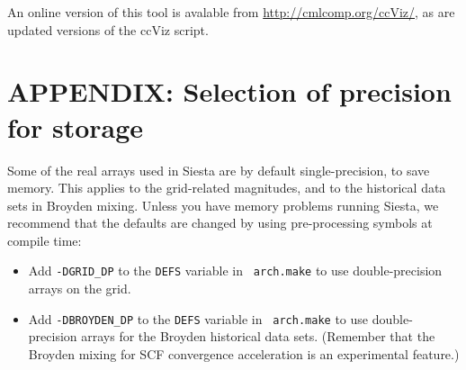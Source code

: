 \documentclass[11pt]{article}
\begin{document}
An online version of this tool is avalable from
\url{http://cmlcomp.org/ccViz/}, as are updated versions of
the ccViz script.

\newpage
\section{APPENDIX: Selection of precision for storage}

Some of the real arrays used in Siesta are by default
single-precision, to save memory. This applies to the grid-related
magnitudes, and to the historical data sets in Broyden mixing. 
Unless you have memory problems running Siesta, we recommend that 
the defaults are changed by using pre-processing symbols at compile
time:

\begin{itemize}
\item Add {\tt -DGRID\_DP} to the {\tt DEFS} variable in {\tt
  arch.make} to use double-precision arrays on the grid.
\item Add {\tt -DBROYDEN\_DP} to the {\tt DEFS} variable in {\tt
  arch.make} to use double-precision arrays for the Broyden historical
  data sets. (Remember that the Broyden mixing for SCF convergence
  acceleration is an experimental feature.)
\end{itemize}

\printindex
\end{document}
